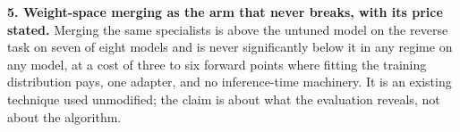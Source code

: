 \textbf{5. Weight-space merging as the arm that never breaks, with its price stated.} Merging the same
specialists is above the untuned model on the reverse task on seven of eight models and is never
significantly below it in any regime on any model, at a cost of three to six forward points where
fitting the training distribution pays, one adapter, and no inference-time machinery. It is an existing
technique used unmodified; the claim is about what the evaluation reveals, not about the algorithm.
